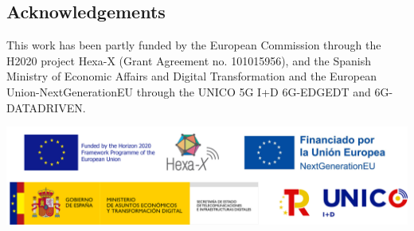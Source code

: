 \documentclass[a0,portrait]{a0poster}
\begin{document}
\begin{multicols}{2}
\section*{Acknowledgements}
This work has been partly funded by the European Commission through the H2020 project Hexa-X (Grant Agreement no. 101015956), and the Spanish Ministry of Economic Affairs and Digital Transformation and the European Union-NextGenerationEU through the UNICO 5G I+D 6G-EDGEDT and 6G-DATADRIVEN.

\begin{center}\vspace{1cm}
    \includegraphics[width=.8\linewidth]{figures/ack-logos.png}
    \label{fig:foreco}
\end{center}\vspace{1cm}




\end{multicols}
\end{document}
